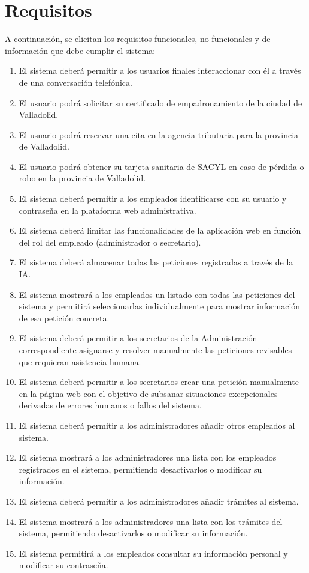 \section{Requisitos}
    A continuación, se elicitan los requisitos funcionales, no funcionales y de información que debe cumplir el sistema:
    \begin{enumerate}
        \item[RF1.] El sistema deberá permitir a los usuarios finales interaccionar con él a través de una conversación telefónica.
        \item[RF2.] El usuario podrá solicitar su certificado de empadronamiento de la ciudad de Valladolid.
        \item[RF3.] El usuario podrá reservar una cita en la agencia tributaria para la provincia de Valladolid.
        \item[RF4.] El usuario podrá obtener su tarjeta sanitaria de SACYL en caso de pérdida o robo en la provincia de Valladolid.
        \item[RF5.] El sistema deberá permitir a los empleados identificarse con su usuario y contraseña en la plataforma web administrativa.
        \item[RF6.] El sistema deberá limitar las funcionalidades de la aplicación web en función del rol del empleado (administrador o secretario).
        \item[RF7.] El sistema deberá almacenar todas las peticiones registradas a través de la IA.
        \item[RF8.] El sistema mostrará a los empleados un listado con todas las peticiones del sistema y permitirá seleccionarlas individualmente para mostrar información de esa petición concreta.
        \item[RF9.] El sistema deberá permitir a los secretarios de la Administración correspondiente asignarse y resolver manualmente las peticiones revisables que requieran asistencia humana.
        \item[RF10.] El sistema deberá permitir a los secretarios crear una petición manualmente en la página web con el objetivo de subsanar situaciones excepcionales derivadas de errores humanos o fallos del sistema.
        \item[RF11.] El sistema deberá permitir a los administradores añadir otros empleados al sistema.
        \item[RF12.] El sistema mostrará a los administradores una lista con los empleados registrados en el sistema, permitiendo desactivarlos o modificar su información.
        \item[RF13.] El sistema deberá permitir a los administradores añadir trámites al sistema.
        \item[RF14.] El sistema mostrará a los administradores una lista con los trámites del sistema, permitiendo desactivarlos o modificar su información.
        \item[RF15.] El sistema permitirá a los empleados consultar su información personal y modificar su contraseña.
        

\end{enumerate}

